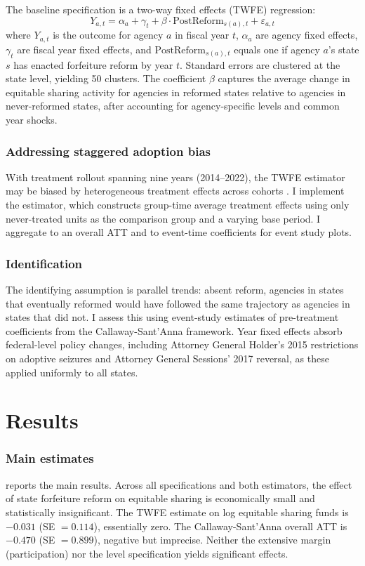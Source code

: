\documentclass[12pt]{article}
\begin{document}
The baseline specification is a two-way fixed effects (TWFE) regression:
\begin{equation}
Y_{a,t} = \alpha_a + \gamma_t + \beta \cdot \text{PostReform}_{s(a),t} + \varepsilon_{a,t}
\label{eq:twfe}
\end{equation}
where $Y_{a,t}$ is the outcome for agency $a$ in fiscal year $t$, $\alpha_a$ are agency fixed effects, $\gamma_t$ are fiscal year fixed effects, and $\text{PostReform}_{s(a),t}$ equals one if agency $a$'s state $s$ has enacted forfeiture reform by year $t$. Standard errors are clustered at the state level, yielding 50 clusters. The coefficient $\beta$ captures the average change in equitable sharing activity for agencies in reformed states relative to agencies in never-reformed states, after accounting for agency-specific levels and common year shocks.

\subsubsection*{Addressing staggered adoption bias} With treatment rollout spanning nine years (2014--2022), the TWFE estimator may be biased by heterogeneous treatment effects across cohorts \citep{GoodmanBacon2021, deChaisemartin2020}. I implement the \citet{CallawayS2021} estimator, which constructs group-time average treatment effects using only never-treated units as the comparison group and a varying base period. I aggregate to an overall ATT and to event-time coefficients for event study plots.

\subsubsection*{Identification} The identifying assumption is parallel trends: absent reform, agencies in states that eventually reformed would have followed the same trajectory as agencies in states that did not. I assess this using event-study estimates of pre-treatment coefficients from the Callaway-Sant'Anna framework. Year fixed effects absorb federal-level policy changes, including Attorney General Holder's 2015 restrictions on adoptive seizures and Attorney General Sessions' 2017 reversal, as these applied uniformly to all states.

\section{Results}\label{sec:results}

\subsubsection*{Main estimates}  reports the main results. Across all specifications and both estimators, the effect of state forfeiture reform on equitable sharing is economically small and statistically insignificant. The TWFE estimate on log equitable sharing funds is $-0.031$ (SE $= 0.114$), essentially zero. The Callaway-Sant'Anna overall ATT is $-0.470$ (SE $= 0.899$), negative but imprecise. Neither the extensive margin (participation) nor the level specification yields significant effects.
\end{document}
